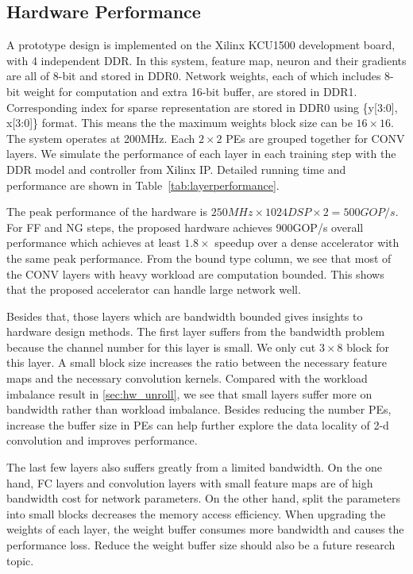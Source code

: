 

\subsection{Hardware Performance}
A prototype design is implemented on the Xilinx KCU1500 development board, with 4 independent DDR. In this system, feature map, neuron and their gradients are all of 8-bit and stored in DDR0. Network weights, each of which includes 8-bit weight for computation and extra 16-bit buffer, are stored in DDR1. Corresponding index for sparse representation are stored in DDR0 using \{y[3:0], x[3:0]\} format. This means the the maximum weights block size can be $16\times 16$. The system operates at 200MHz. Each $2\times 2$ PEs are grouped together for CONV layers. We simulate the performance of each layer in each training step with the DDR model and controller from Xilinx IP. Detailed running time and performance are shown in Table~\ref{tab:layerperformance}.





The peak performance of the hardware is $250MHz \times 1024DSP \times 2 = 500GOP/s$. For FF and NG steps, the proposed hardware achieves 900GOP/s overall performance which achieves at least $1.8\times$ speedup over a dense accelerator with the same peak performance. From the bound type column, we see that most of the CONV layers with heavy workload are computation bounded. This shows that the proposed accelerator can handle large network well.

Besides that, those layers which are bandwidth bounded gives insights to hardware design methods. The first layer suffers from the bandwidth problem because the channel number for this layer is small. We only cut $3\times 8$ block for this layer. A small block size increases the ratio between the necessary feature maps and the necessary convolution kernels. Compared with the workload imbalance result in \ref{sec:hw_unroll}, we see that small layers suffer more on bandwidth rather than workload imbalance. Besides reducing the number PEs, increase the buffer size in PEs can help further explore the data locality of 2-d convolution and improves performance. 

The last few layers also suffers greatly from a limited bandwidth. On the one hand, FC layers and convolution layers with small feature maps are of high bandwidth cost for network parameters. On the other hand, split the parameters into small blocks decreases the memory access efficiency. When upgrading the weights of each layer, the weight buffer consumes more bandwidth and causes the performance loss. Reduce the weight buffer size should also be a future research topic. 

